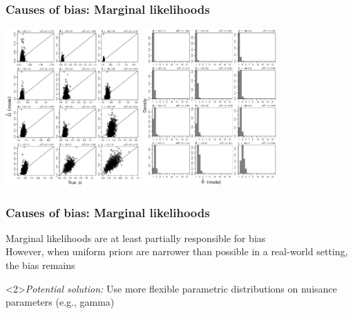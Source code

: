 \begin{frame}
    \frametitle{Causes of bias: Marginal likelihoods}
    \begin{center}
        \includegraphics[height=6cm]{images/SS_accuracy_omega_modes_GLM_inform10.pdf} \quad
        \includegraphics[height=6cm]{images/SS_power_psi_modes_GLM_inform10.pdf}
    \end{center}
\end{frame}

\begin{frame}
    \frametitle{Causes of bias: Marginal likelihoods}
    Marginal likelihoods are at least partially responsible for bias\\
    \bigskip
    However, when uniform priors are narrower than possible in a real-world
    setting, the bias remains
    \bigskip
    \begin{block}<2>{\it Potential solution:}
        Use more flexible parametric distributions on nuisance parameters (e.g., gamma)
    \end{block}
\end{frame}

